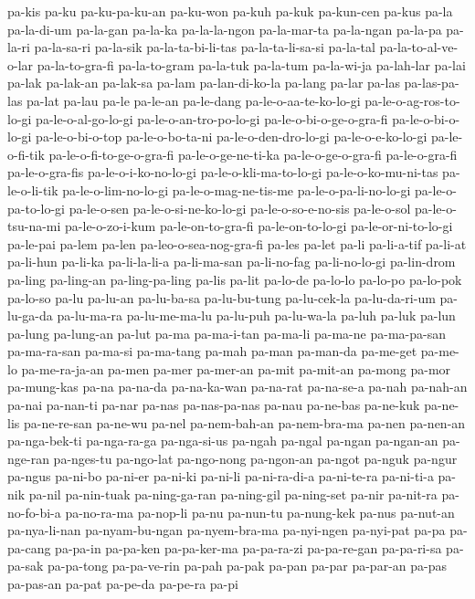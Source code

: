 {pa-kis pa-ku pa-ku-pa-ku-an pa-ku-won pa-kuh pa-kuk pa-kun-cen pa-kus
pa-la pa-la-di-um pa-la-gan pa-la-ka pa-la-la-ngon pa-la-mar-ta pa-la-ngan
pa-la-pa pa-la-ri pa-la-sa-ri pa-la-sik pa-la-ta-bi-li-tas
pa-la-ta-li-sa-si pa-la-tal pa-la-to-al-ve-o-lar pa-la-to-gra-fi
pa-la-to-gram pa-la-tuk pa-la-tum pa-la-wi-ja pa-lah-lar pa-lai pa-lak
pa-lak-an pa-lak-sa pa-lam pa-lan-di-ko-la pa-lang pa-lar pa-las
pa-las-pa-las pa-lat pa-lau pa-le pa-le-an pa-le-dang
pa-le-o-aa-te-ko-lo-gi pa-le-o-ag-ros-to-lo-gi pa-le-o-al-go-lo-gi
pa-le-o-an-tro-po-lo-gi pa-le-o-bi-o-ge-o-gra-fi pa-le-o-bi-o-lo-gi
pa-le-o-bi-o-top pa-le-o-bo-ta-ni pa-le-o-den-dro-lo-gi pa-le-o-e-ko-lo-gi
pa-le-o-fi-tik pa-le-o-fi-to-ge-o-gra-fi pa-le-o-ge-ne-ti-ka
pa-le-o-ge-o-gra-fi pa-le-o-gra-fi pa-le-o-gra-fis pa-le-o-i-ko-no-lo-gi
pa-le-o-kli-ma-to-lo-gi pa-le-o-ko-mu-ni-tas pa-le-o-li-tik
pa-le-o-lim-no-lo-gi pa-le-o-mag-ne-tis-me pa-le-o-pa-li-no-lo-gi
pa-le-o-pa-to-lo-gi pa-le-o-sen pa-le-o-si-ne-ko-lo-gi pa-le-o-so-e-no-sis
pa-le-o-sol pa-le-o-tsu-na-mi pa-le-o-zo-i-kum pa-le-on-to-gra-fi
pa-le-on-to-lo-gi pa-le-or-ni-to-lo-gi pa-le-pai pa-lem pa-len
pa-leo-o-sea-nog-gra-fi pa-les pa-let pa-li pa-li-a-tif pa-li-at pa-li-hun
pa-li-ka pa-li-la-li-a pa-li-ma-san pa-li-no-fag pa-li-no-lo-gi
pa-lin-drom pa-ling pa-ling-an pa-ling-pa-ling pa-lis pa-lit pa-lo-de
pa-lo-lo pa-lo-po pa-lo-pok pa-lo-so pa-lu pa-lu-an pa-lu-ba-sa
pa-lu-bu-tung pa-lu-cek-la pa-lu-da-ri-um pa-lu-ga-da pa-lu-ma-ra
pa-lu-me-ma-lu pa-lu-puh pa-lu-wa-la pa-luh pa-luk pa-lun pa-lung
pa-lung-an pa-lut pa-ma pa-ma-i-tan pa-ma-li pa-ma-ne pa-ma-pa-san
pa-ma-ra-san pa-ma-si pa-ma-tang pa-mah pa-man pa-man-da pa-me-get
pa-me-lo pa-me-ra-ja-an pa-men pa-mer pa-mer-an pa-mit pa-mit-an pa-mong
pa-mor pa-mung-kas pa-na pa-na-da pa-na-ka-wan pa-na-rat pa-na-se-a pa-nah
pa-nah-an pa-nai pa-nan-ti pa-nar pa-nas pa-nas-pa-nas pa-nau pa-ne-bas
pa-ne-kuk pa-ne-lis pa-ne-re-san pa-ne-wu pa-nel pa-nem-bah-an
pa-nem-bra-ma pa-nen pa-nen-an pa-nga-bek-ti pa-nga-ra-ga pa-nga-si-us
pa-ngah pa-ngal pa-ngan pa-ngan-an pa-nge-ran pa-nges-tu pa-ngo-lat
pa-ngo-nong pa-ngon-an pa-ngot pa-nguk pa-ngur pa-ngus pa-ni-bo pa-ni-er
pa-ni-ki pa-ni-li pa-ni-ra-di-a pa-ni-te-ra pa-ni-ti-a pa-nik pa-nil
pa-nin-tuak pa-ning-ga-ran pa-ning-gil pa-ning-set pa-nir pa-nit-ra
pa-no-fo-bi-a pa-no-ra-ma pa-nop-li pa-nu pa-nun-tu pa-nung-kek pa-nus
pa-nut-an pa-nya-li-nan pa-nyam-bu-ngan pa-nyem-bra-ma pa-nyi-ngen
pa-nyi-pat pa-pa pa-pa-cang pa-pa-in pa-pa-ken pa-pa-ker-ma pa-pa-ra-zi
pa-pa-re-gan pa-pa-ri-sa pa-pa-sak pa-pa-tong pa-pa-ve-rin pa-pah pa-pak
pa-pan pa-par pa-par-an pa-pas pa-pas-an pa-pat pa-pe-da pa-pe-ra pa-pi
}
